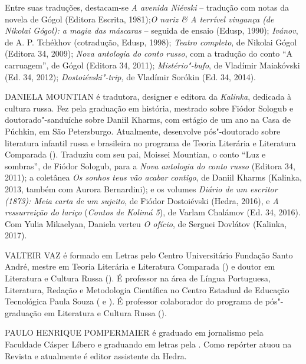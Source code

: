 Entre suas traduções, destacam-se \emph{A avenida Niévski} -- tradução
com notas da novela de Gógol (Editora Escrita, 1981);\emph{O nariz \& A
terrível vingança (de Nikolai Gógol): a magia das máscaras} -- seguida
de ensaio (Edusp, 1990); \emph{Ivánov}, de A. P. Tchékhov (cotradução,
Edusp, 1998); \emph{Teatro completo}, de Nikolai Gógol (Editora 34,
2009); \emph{Nova antologia do conto russo}, com a tradução do conto ``A
carruagem'', de Gógol (Editora 34, 2011); \emph{Mistério"-bufo}, de
Vladímir Maiakóvski (Ed. 34, 2012); \emph{Dostoiévski"-trip,} de Vladímir
Sorókin (Ed. 34, 2014).

\medskip

\noindent{}DANIELA MOUNTIAN é tradutora, designer e editora da \emph{Kalinka},
dedicada à cultura russa. Fez pela \scalebox{0.8}{USP} graduação em história, mestrado
sobre Fiódor Sologub e doutorado"-sanduíche sobre Daniil Kharms, com
estágio de um ano na Casa de Púchkin, em São Petersburgo. Atualmente,
desenvolve pós"-doutorado sobre literatura infantil russa e brasileira no
programa de Teoria Literária e Literatura Comparada (\scalebox{0.8}{USP}). Traduziu com
seu pai, Moissei Mountian, o conto ``Luz e sombras'', de Fiódor Sologub,
para a \emph{Nova antologia do conto russo} (Editora 34, 2011); a
coletânea \emph{Os sonhos teus vão acabar contigo}, de Daniil Kharms
(Kalinka, 2013, também com Aurora Bernardini); e os volumes \emph{Diário
de um escritor (1873): Meia carta de um sujeito}, de Fiódor Dostoiévski
(Hedra, 2016), e \emph{A ressurreição do lariço} (\emph{Contos de Kolimá
5}), de Varlam Chalámov (Ed. 34, 2016). Com Yulia Mikaelyan, Daniela
verteu \emph{O ofício}, de Serguei Dovlátov (Kalinka, 2017).

\medskip

\noindent{}VALTEIR VAZ é formado em Letras pelo Centro Universitário Fundação Santo
André, mestre em Teoria Literária e Literatura Comparada (\scalebox{0.8}{USP}) e doutor
em Literatura e Cultura Russa (\scalebox{0.8}{USP}). É professor na área de Língua
Portuguesa, Literatura, Redação e Metodologia Científica no Centro
Estadual de Educação Tecnológica Paula Souza (\scalebox{0.8}{ETEC} e \scalebox{0.8}{FATEC}). É professor
colaborador do programa de pós"-graduação em Literatura e Cultura Russa
(\scalebox{0.8}{LETRA/USP}).

\medskip

\noindent{}PAULO HENRIQUE POMPERMAIER é graduado em jornalismo pela Faculdade Cásper Líbero e graduando em letras pela \scalebox{0.8}{USP}. Como repórter atuou na Revista \scalebox{0.8}{CULT} e atualmente é editor assistente da Hedra.


